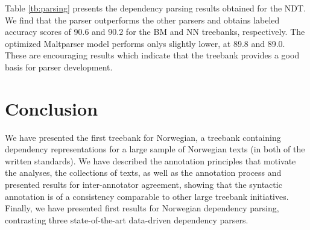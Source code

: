 \documentclass[11pt,a4paper]{article}
\begin{document}
Table \ref{tb:parsing} presents the dependency parsing results
obtained for the NDT. We find that the  parser
outperforms the other parsers and obtains labeled accuracy scores of
90.6 and 90.2 for the BM and NN treebanks, respectively.  The
optimized Maltparser model performs onlys slightly lower, at 89.8 and
89.0.  These are encouraging results which indicate that the treebank
provides a good basis for parser development.

\section{Conclusion}
We have presented the first treebank for Norwegian, a treebank
containing dependency representations for a large sample of Norwegian
texts (in both of the written standards). We have described the
annotation principles that motivate the analyses, the collections of
texts, as well as the annotation process and presented results for
inter-annotator agreement, showing that the syntactic annotation is of
a consistency comparable to other large treebank initiatives. Finally,
we have presented first results for Norwegian dependency parsing,
contrasting three state-of-the-art data-driven dependency parsers.


\clearpage

\end{document}
